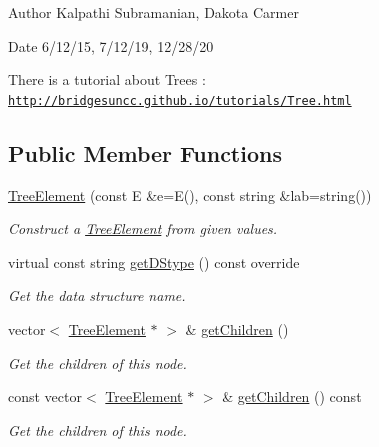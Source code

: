 \begin{DoxyAuthor}{Author}
Kalpathi Subramanian, Dakota Carmer 
\end{DoxyAuthor}
\begin{DoxyDate}{Date}
6/12/15, 7/12/19, 12/28/20
\end{DoxyDate}
There is a tutorial about Trees \+: \href{http://bridgesuncc.github.io/tutorials/Tree.html}{\tt http\+://bridgesuncc.\+github.\+io/tutorials/\+Tree.\+html} \subsection*{Public Member Functions}
\begin{DoxyCompactItemize}
\item 
\hyperlink{classbridges_1_1datastructure_1_1_tree_element_a0d719458938ba46a509635591ba2290b}{Tree\+Element} (const E \&e=E(), const string \&lab=string())
\begin{DoxyCompactList}\small\item\em Construct a \hyperlink{classbridges_1_1datastructure_1_1_tree_element}{Tree\+Element} from given values. \end{DoxyCompactList}\item 
virtual const string \hyperlink{classbridges_1_1datastructure_1_1_tree_element_a897f34ea284da45e1dc869c3e3b6c9a4}{get\+D\+Stype} () const override
\begin{DoxyCompactList}\small\item\em Get the data structure name. \end{DoxyCompactList}\item 
vector$<$ \hyperlink{classbridges_1_1datastructure_1_1_tree_element}{Tree\+Element} $\ast$ $>$ \& \hyperlink{classbridges_1_1datastructure_1_1_tree_element_a3ea19ec0178ceb531a707d87d6fd42d3}{get\+Children} ()
\begin{DoxyCompactList}\small\item\em Get the children of this node. \end{DoxyCompactList}\item 
const vector$<$ \hyperlink{classbridges_1_1datastructure_1_1_tree_element}{Tree\+Element} $\ast$ $>$ \& \hyperlink{classbridges_1_1datastructure_1_1_tree_element_a1fc634a6eaab3800f925429ace209469}{get\+Children} () const
\begin{DoxyCompactList}\small\item\em Get the children of this node. \end{DoxyCompactList}\item 

\end{DoxyCompactItemize}
